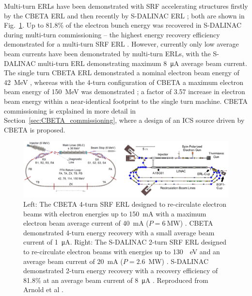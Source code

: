 \documentclass[../main.tex]{subfiles}
\begin{document}
Multi-turn ERLs have been demonstrated with SRF accelerating structures firstly by the CBETA ERL \cite{bartnik2020cbeta} and then recently by S-DALINAC ERL \cite{arnold2020first,adolphsen2022european}; both are shown in Fig.~\ref{fig:CBETA_SDALINAC_diagram}. Up to 81.8\% of the electron bunch energy was recovered in S-DALINAC during multi-turn commissioning -- the highest energy recovery efficiency demonstrated for a multi-turn SRF ERL \cite{adolphsen2022european}. However, currently only low average beam currents have been demonstrated by multi-turn ERLs, with the S-DALINAC multi-turn ERL demonstrating maximum 8~\si{\micro\ampere} average beam current. The single turn CBETA ERL demonstrated a nominal electron beam energy of 42~\si{\mega\electronvolt} \cite{gulliford2021measurement}, whereas with the 4-turn configuration of CBETA a maximum electron beam energy of 150~\si{\mega\electronvolt} was demonstrated \cite{bartnik2020cbeta}; a factor of 3.57 increase in electron beam energy within a near-identical footprint to the single turn machine. CBETA commissioning is explained in more detail in Section~\ref{sec:CBETA_commissioning}, where a design of an ICS source driven by CBETA is proposed.
\begin{figure}[!h]
\centering
\includegraphics[width=\textwidth]{Figures/Introduction/CBETA_SDALINAC_diagram.pdf}
\caption{Left: The CBETA 4-turn SRF ERL designed to re-circulate electron beams with electron energies up to 150~\si{\milli\ampere} with a maximum electron beam average current of 40~\si{\milli\ampere} ($P = 6~\si{\mega\watt}$) \cite{hoffstaetter2017cbeta}. CBETA demonstrated 4-turn energy recovery with a small average beam current of 1~\si{\micro\ampere}. Right: The S-DALINAC 2-turn SRF ERL designed to re-circulate electron beams with energies up to 130~\si{\meg\electronvolt} and an average beam current of 20~\si{\milli\ampere} ($P = 2.6$~\si{\mega\watt}) \cite{arnold2017erl}. S-DALINAC demonstrated 2-turn energy recovery with a recovery efficiency of 81.8\% at an average beam current of 8~\si{\micro\ampere} \cite{adolphsen2022european}. Reproduced from Arnold et al \cite{arnold2020first}.}
\label{fig:CBETA_SDALINAC_diagram}
\end{figure}
\end{document}

